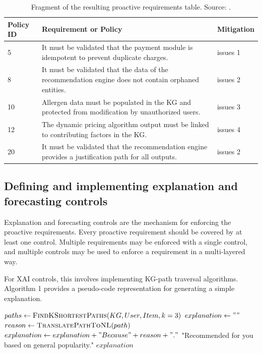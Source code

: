 \documentclass[preprint,10pt]{elsarticle}
\begin{document}
\begin{table}[h!]
    \caption{Fragment of the resulting proactive requirements table. Source: .}
    \label{tab:13}
    \centering
    \begin{tabular}{lp{8cm}l}
        \toprule
        \textbf{Policy ID} & \textbf{Requirement or Policy} & \textbf{Mitigation} \\
        \midrule
        5 & It must be validated that the payment module is idempotent to prevent duplicate charges. & issues 1 \\
        8 & It must be validated that the data of the recommendation engine does not contain orphaned entities. & issues 2 \\
        10 & Allergen data must be populated in the KG and protected from modification by unauthorized users. & issues 3 \\
        12 & The dynamic pricing algorithm output must be linked to contributing factors in the KG. & issues 4 \\
        20 & It must be validated that the recommendation engine provides a justification path for all outputs. & issues 2 \\
        \bottomrule
    \end{tabular}
\end{table}

\subsection{Defining and implementing explanation and forecasting controls}

Explanation and forecasting controls are the mechanism for enforcing the proactive requirements. Every proactive requirement should be covered by at least one control. Multiple requirements may be enforced with a single control, and multiple controls may be used to enforce a requirement in a multi-layered way.

For XAI controls, this involves implementing KG-path traversal algorithms. Algorithm 1 provides a pseudo-code representation for generating a simple explanation.

\begin{algorithm}
\caption{KG-Path Traversal for Recommendation Explanation}\label{alg:cap}
\begin{algorithmic}
    \State $paths \gets \Call{FindKShortestPaths}{KG, User, Item, k=3}$
    \State $explanation \gets ""$
        \State $reason \gets \Call{TranslatePathToNL}{path}$
        \State $explanation \gets explanation + "Because " + reason + ". "$
    \EndFor
        \State \Return "Recommended for you based on general popularity."
    \EndIf
    \State \Return $explanation$
\EndProcedure
\end{algorithmic}
\end{algorithm}
\end{document}
